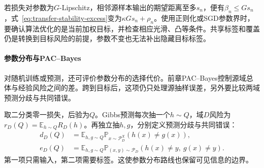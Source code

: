 若损失对参数为$G$-Lipschitz，相邻源样本输出的期望距离至多$s_n$，便有$\beta_n\leq Gs_n$，式~\eqref{eq:transfer-stability-excess}变为$\kappa Gs_n+\rho_n$。使用正则化或SGD参数界时，要确认算法优化的是当前加权目标，并检查相应光滑、凸等条件。共享标签和覆盖仍是转换到目标风险的前提，参数不变也无法补出隐藏目标标签。

\paragraph{参数分布与PAC--Bayes}
\label{sec:transfer-pac-bayes}

对随机训练或预测，还可评价参数分布的选择代价。前章PAC--Bayes控制源域总体与经验风险之间的差。跨到目标后，这项仍只处理源抽样误差，另外要比较两域预测分歧与共同错误。

取二分类零一损失，后验为$Q$。Gibbs预测每次抽一个$h\sim Q$，域$D$风险为$r_D(Q)=\mathbb E_{h\sim Q}R_D(h)$。再独立抽$h,g$，分别定义预测分歧与共同错误：
\begin{align*}
 d_D(Q)&=\mathbb E_{h,g\sim Q}\mathbb P_{x\sim\mathcal P_D^X}(h(x)\neq g(x)),\\
 e_D(Q)&=\mathbb E_{h,g\sim Q}\mathbb P_{(x,y)\sim\mathcal P_D}
                       (h(x)\neq y,\ g(x)\neq y).
\end{align*}
第一项只需输入，第二项需要标签。这使参数分布路线也保留可见信息的边界。

